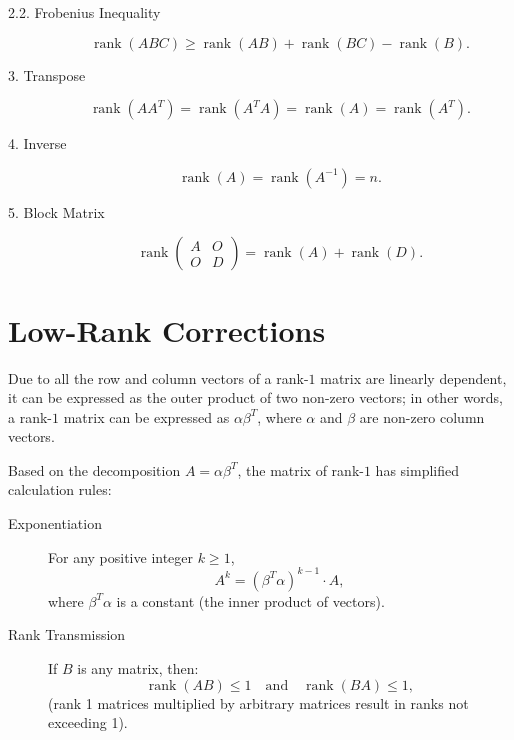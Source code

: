 \documentclass[11pt]{../../TexTemplate/elegantbook} %
\begin{document}
\begin{proposition}
\begin{description}
        \item[2.2. Frobenius Inequality]
        \[
        \operatorname{rank}(ABC) \geqslant \operatorname{rank}(AB) + \operatorname{rank}(BC) - \operatorname{rank}(B).
        \]

        \item [3. Transpose]
        \[
        \operatorname{rank}(AA^T) = \operatorname{rank}(A^TA) = \operatorname{rank}(A) = \operatorname{rank}(A^T).
        \]

        \item [4. Inverse]
        \[
        \operatorname{rank}(A) = \operatorname{rank}(A^{-1}) = n.
        \]

        \item[5. Block Matrix]
        \[
        \operatorname{rank}\begin{pmatrix} A & O \\ O & D \end{pmatrix} = \operatorname{rank}(A) + \operatorname{rank}(D).
        \]
    \end{description}
\end{proposition}

\section{Low-Rank Corrections}
Due to all the row and column vectors of a rank-\(1\) matrix are linearly dependent,
it can be expressed as the outer product of two non-zero vectors;
in other words, a rank-\(1\) matrix can be expressed as \( \alpha \beta^T \),
where \( \alpha \) and \( \beta \) are non-zero column vectors.

Based on the decomposition \( A = \alpha \beta^T \), the matrix of rank-\(1\) has simplified calculation rules:
\begin{property}
    \begin{description}
        \item [Exponentiation]  
        For any positive integer \( k \geq 1 \),
        \[
        A^k = (\beta^T\alpha)^{k-1} \cdot A,
        \]
        where \( \beta^T\alpha \) is a constant (the inner product of vectors).
        \item [Rank Transmission]  
        If \( B \) is any matrix, then:
        \[
        \operatorname{rank}(AB) \leq 1 \quad \text{and} \quad \operatorname{rank}(BA) \leq 1,
        \]
        (rank 1 matrices multiplied by arbitrary matrices result in ranks not exceeding 1).
    \end{description}
\end{property}
\end{document}
